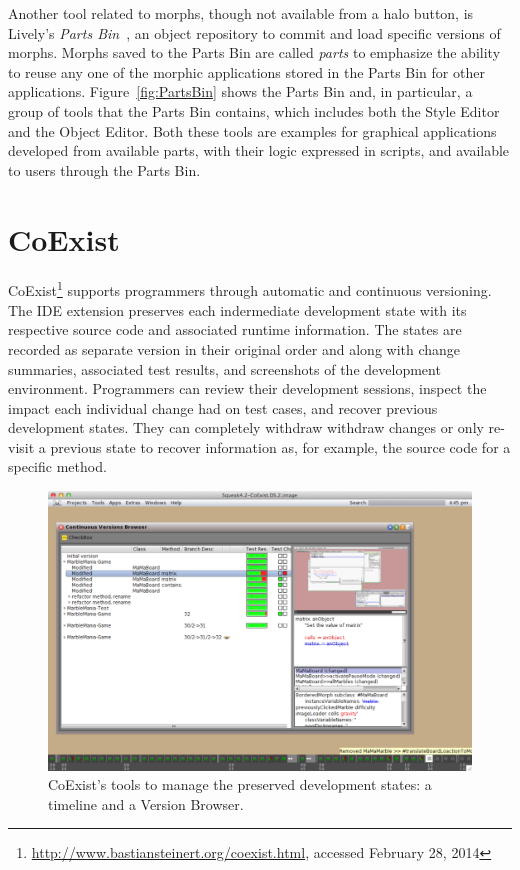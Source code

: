 Another tool related to morphs, though not available from a halo button, is Lively's \emph{Parts Bin}~\cite{Lincke2012LPC}, an object repository to commit and load specific versions of morphs.
Morphs saved to the Parts Bin are called \emph{parts} to emphasize the ability to reuse any one of the morphic applications stored in the Parts Bin for other applications.
Figure~\ref{fig:PartsBin} shows the Parts Bin and, in particular, a group of tools that the Parts Bin contains, which includes both the Style Editor and the Object Editor.
Both these tools are examples for graphical applications developed from available parts, with their logic expressed in scripts, and available to users through the Parts Bin.


\section{CoExist}

CoExist\footnote{\url{http://www.bastiansteinert.org/coexist.html}, accessed February 28, 2014} supports programmers through automatic and continuous versioning.
The IDE extension preserves each indermediate development state with its respective source code and associated runtime information.
The states are recorded as separate version in their original order and along with change summaries, associated test results, and screenshots of the development environment.
Programmers can review their development sessions, inspect the impact each individual change had on test cases, and recover previous development states.
They can completely withdraw withdraw changes or only re-visit a previous state to recover information as, for example, the source code for a specific method.

\begin{figure}[h]
    \centering
    \includegraphics[width=\textwidth]{figures/coexistTools.pdf}
    \caption{CoExist's tools to manage the preserved development states: a timeline and a Version Browser.}
    \label{fig:CoExist}
\end{figure}

